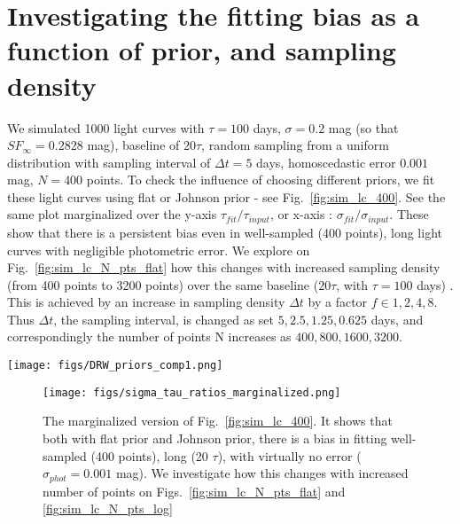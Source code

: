 \documentclass[fleqn,usenatbib]{mnras}  %
\begin{document}
\section{Investigating the fitting bias as a function of prior, and sampling density}
We simulated 1000 light curves with $\tau=100$ days, $\sigma=0.2$ mag (so that $SF_{\infty}=0.2828$ mag), baseline of $20 \tau$, random sampling from  a uniform distribution with sampling interval of $\Delta t=5$ days,   homoscedastic error $0.001$ mag, $N=400$ points. To check the influence of choosing different priors, we fit these light curves  using flat or Johnson prior - see Fig.~\ref{fig:sim_lc_400}. See the same plot marginalized over the y-axis $\tau_{fit} / \tau_{input}$, or x-axis : $\sigma_{fit} / \sigma_{input}$. These show that there is a persistent bias even in well-sampled (400 points), long light curves with negligible photometric error. We explore on Fig.~\ref{fig:sim_lc_N_pts_flat} how this changes with increased sampling density (from 400 points to 3200 points) over the same baseline ($20 \tau$, with $\tau=100$ days) . This is achieved by an increase in sampling density $\Delta t$ by a factor $f \in {1,2,4,8}$. Thus $\Delta t$, the sampling interval, is changed as set ${5,2.5, 1.25, 0.625} $ days, and correspondingly the number of points N increases as ${400,800,1600,3200}$.



\begin{figure*}
\texttt{[image: figs/DRW\_priors\_comp1.png]}
\caption{We plot results of fitting the simulated light curves with Celerite Real Term kernel, with flat (left), or Johnson prior (right). The cross shows the location of truth.  Both are offset, and Fig.~\ref{fig:sim_lc_400_marg} shows the marginalized version of that plot. We repeat the same experiment,  increasing the number of points tenfold to show the behavior of the bias. }
\label{fig:sim_lc_400}
\end{figure*} 


\begin{figure}
\texttt{[image: figs/sigma\_tau\_ratios\_marginalized.png]}
\caption{The marginalized version of Fig.~\ref{fig:sim_lc_400}. It shows that both with flat prior and Johnson prior,  there is a bias in fitting well-sampled (400 points), long (20 $\tau$), with virtually no error ($\sigma_{phot}=0.001 $ mag). We investigate how this changes with increased number of points on Figs.~\ref{fig:sim_lc_N_pts_flat} and \ref{fig:sim_lc_N_pts_log}}
\label{fig:sim_lc_400_marg}
\end{figure}
\end{document}
